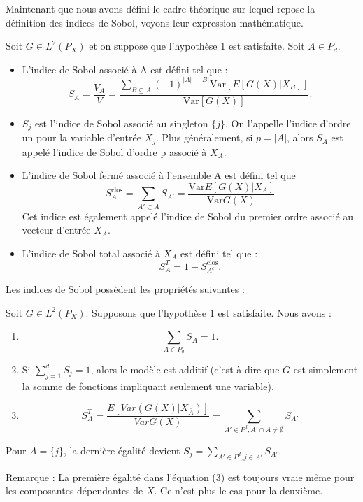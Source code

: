 \documentclass[
]{article}
\begin{document}
Maintenant que nous avons défini le cadre théorique sur lequel repose la
définition des indices de Sobol, voyons leur expression mathématique.

Soit \(G \in L^2(P_X)\) et on suppose que l'hypothèse 1 est satisfaite.
Soit \(A \in P_d\).

\begin{itemize}
\item
  L'indice de Sobol associé à A est défini tel que : \[
  S_A = \frac{V_A}{V} = \frac{\sum_{B \subseteq A} (-1)^{|A| - |B|} \text{Var} \left[E[G(X) | X_B]\right]}{\text{Var} [G(X)]}.
  \]
\item
  \(S_j\) est l'indice de Sobol associé au singleton \(\{j\}\). On
  l'appelle l'indice d'ordre un pour la variable d'entrée \(X_j\). Plus
  généralement, si \(p = |A|\), alors \(S_A\) est appelé l'indice de
  Sobol d'ordre p associé à \(X_A\).
\item
  L'indice de Sobol fermé associé à l'ensemble A est défini tel que
  \[ S^{\text{clos}}_A = \sum_{A'\subset A}S_{A'}=\frac{\text{Var} E[G(X)|X_A]}{\text{Var} G(X)} \]
  Cet indice est également appelé l'indice de Sobol du premier ordre
  associé au vecteur d'entrée \(X_A\).
\item
  L'indice de Sobol total associé à \(X_A\) est défini tel que : \[
  S^{T}_A = 1 - S^{\text{clos}}_{A^c}.
  \]
\end{itemize}

Les indices de Sobol possèdent les propriétés suivantes :

Soit \(G \in L^2(P_X)\). Supposons que l'hypothèse \(1\) est satisfaite.
Nous avons :

\begin{enumerate}
\def\labelenumi{\arabic{enumi}.}
\item
  \[
  \sum_{A \in P_d} S_A = 1.
  \]
\item
  Si \(\sum_{j=1}^d S_j = 1\), alors le modèle est additif (c'est-à-dire
  que \(G\) est simplement la somme de fonctions impliquant seulement
  une variable).
\item
  \[
  S_{A}^T = \frac{E [ Var (G(X)|X_{\bar{A}}) ]}{Var G(X)} =\sum_{A' \in P^d, A' \cap A \neq \emptyset} S_{A'}\tag{3}
  \]
\end{enumerate}

Pour \(A = \{j\}\), la dernière égalité devient
\(S_j = \sum_{A' \in P^d, j \in A'} S_{A'}\).

Remarque : La première égalité dans l'équation (3) est toujours vraie
même pour les composantes dépendantes de \(X\). Ce n'est plus le cas
pour la deuxième.
\end{document}
